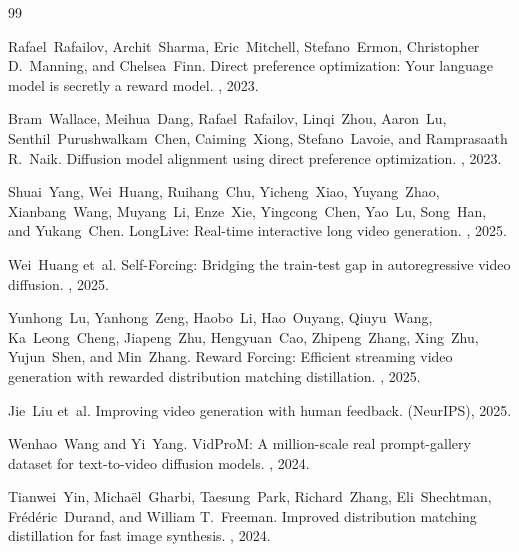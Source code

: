 \documentclass{article}
\begin{document}

\begin{thebibliography}{99}

Rafael~Rafailov, Archit~Sharma, Eric~Mitchell, Stefano~Ermon, Christopher D.~Manning, and Chelsea~Finn.
\newblock Direct preference optimization: Your language model is secretly a reward model.
, 2023.

Bram~Wallace, Meihua~Dang, Rafael~Rafailov, Linqi~Zhou, Aaron~Lu, Senthil~Purushwalkam~Chen, Caiming~Xiong, Stefano~Lavoie, and Ramprasaath R.~Naik.
\newblock Diffusion model alignment using direct preference optimization.
, 2023.

Shuai~Yang, Wei~Huang, Ruihang~Chu, Yicheng~Xiao, Yuyang~Zhao, Xianbang~Wang, Muyang~Li, Enze~Xie, Yingcong~Chen, Yao~Lu, Song~Han, and Yukang~Chen.
\newblock LongLive: Real-time interactive long video generation.
, 2025.

Wei~Huang et~al.
\newblock Self-Forcing: Bridging the train-test gap in autoregressive video diffusion.
, 2025.

Yunhong~Lu, Yanhong~Zeng, Haobo~Li, Hao~Ouyang, Qiuyu~Wang, Ka~Leong~Cheng, Jiapeng~Zhu, Hengyuan~Cao, Zhipeng~Zhang, Xing~Zhu, Yujun~Shen, and Min~Zhang.
\newblock Reward Forcing: Efficient streaming video generation with rewarded distribution matching distillation.
, 2025.

Jie~Liu et~al.
\newblock Improving video generation with human feedback.
 (NeurIPS), 2025.

Wenhao~Wang and Yi~Yang.
\newblock VidProM: A million-scale real prompt-gallery dataset for text-to-video diffusion models.
, 2024.

Tianwei~Yin, Micha\"el~Gharbi, Taesung~Park, Richard~Zhang, Eli~Shechtman, Fr\'ed\'eric~Durand, and William T.~Freeman.
\newblock Improved distribution matching distillation for fast image synthesis.
, 2024.

\end{thebibliography}
\end{document}

